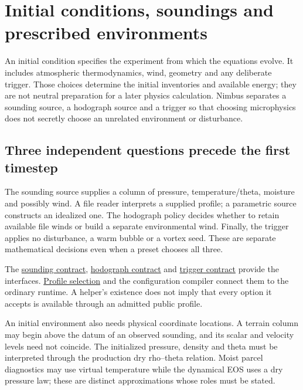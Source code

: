 \chapter{Initial conditions, soundings and prescribed environments}\label{initialization-theory}

An initial condition specifies the experiment from which the equations evolve.
It includes atmospheric thermodynamics, wind, geometry and any deliberate
trigger. Those choices determine the initial inventories and available energy;
they are not neutral preparation for a later physics calculation. Nimbus
separates a sounding source, a hodograph source and a trigger so that choosing
microphysics does not secretly choose an unrelated environment or disturbance.

\section{Three independent questions precede the first timestep}

The sounding source supplies a column of pressure, temperature/theta, moisture
and possibly wind. A file reader interprets a supplied profile; a parametric
source constructs an idealized one. The hodograph policy decides whether to
retain available file winds or build a separate environmental wind. Finally,
the trigger applies no disturbance, a warm bubble or a vortex seed. These are
separate mathematical decisions even when a preset chooses all three.



The \href{../include/init/sounding/sounding_source.hpp}{sounding contract},
\href{../include/init/hodograph/hodograph_source.hpp}{hodograph contract} and
\href{../include/init/trigger/trigger_source.hpp}{trigger contract} provide the
interfaces. \href{../src/init/scheme_profile.cpp}{Profile selection} and the
configuration compiler connect them to the ordinary runtime. A helper's
existence does not imply that every option it accepts is available through an
admitted public profile.

An initial environment also needs physical coordinate locations. A terrain
column may begin above the datum of an observed sounding, and its scalar and
velocity levels need not coincide. The initialized pressure, density and theta
must be interpreted through the production dry rho--theta relation. Moist
parcel diagnostics may use virtual temperature while the dynamical EOS uses a
dry pressure law; these are distinct approximations whose roles must be stated.

